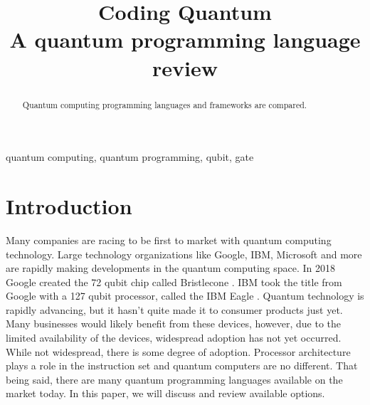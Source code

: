 \documentclass[conference]{IEEEtran}
\begin{document}
\title{ Coding Quantum \\
{\footnotesize A quantum programming language review}
}

\author{
}

\maketitle

\begin{abstract}
Quantum computing programming languages and frameworks are compared.
\end{abstract}

\begin{IEEEkeywords}
quantum computing, quantum programming, qubit, gate
\end{IEEEkeywords}

\section{Introduction}
Many companies are racing to be first to market with quantum computing technology. 
Large technology organizations like Google, IBM, Microsoft and more are rapidly making developments in the quantum computing space. 
In 2018 Google created the 72 qubit chip called Bristlecone \cite{b1}. 
IBM took the title from Google with a 127 qubit processor, called the IBM Eagle \cite{b2}. 
Quantum technology is rapidly advancing, but it hasn't quite made it to consumer products just yet. 
Many businesses would likely benefit from these devices, however, due to the limited availability of the devices, widespread adoption has not yet occurred. 
While not widespread, there is some degree of adoption. 
Processor architecture plays a role in the instruction set and quantum computers are no different. 
That being said, there are many quantum programming languages available on the market today. 
In this paper, we will discuss and review available options. 
\end{document}
